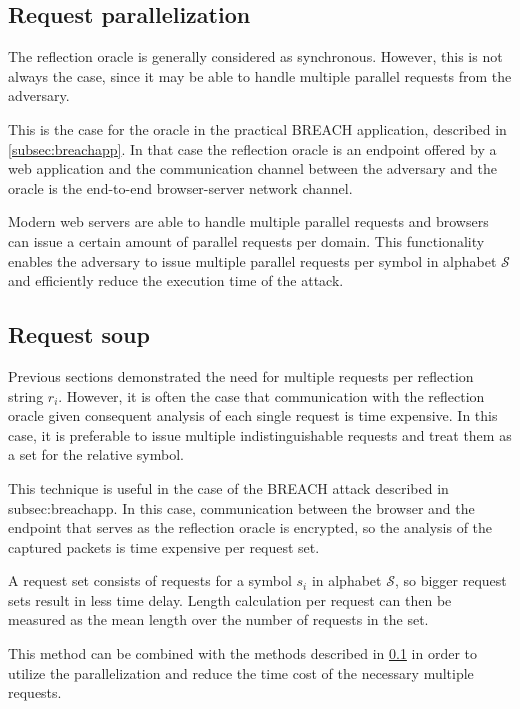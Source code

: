\documentclass{sig-alternate-05-2015}
\begin{document}
\subsection{Request parallelization}\label{subsec:parallel}
The reflection oracle is generally considered as synchronous. However, this is not
always the case, since it may be able to handle multiple parallel requests from
the adversary.

This is the case for the oracle in the practical BREACH application, described
in \ref{subsec:breachapp}. In that case the reflection oracle is an endpoint
offered by a web application and the communication channel between the adversary
and the oracle is the end-to-end browser-server network channel.

Modern web servers are able to handle multiple parallel requests and
browsers can issue a certain amount of parallel requests per domain. This
functionality enables the adversary to issue multiple parallel requests per
symbol in alphabet $\mathcal{S}$ and efficiently reduce the execution time of
the attack.

\subsection{Request soup}
Previous sections demonstrated the need for multiple requests per reflection
string $r_i$. However, it is often the case that communication with the
reflection oracle given consequent analysis of each single request is time
expensive. In this case, it is preferable to issue multiple indistinguishable
requests and treat them as a set for the relative symbol.

This technique is useful in the case of the BREACH attack described in
{subsec:breachapp}. In this case, communication between the browser and the
endpoint that serves as the reflection oracle is encrypted, so the analysis of
the captured packets is time expensive per request set.

A request set consists of requests for a symbol $s_i$ in alphabet $\mathcal{S}$,
so bigger request sets result in less time delay. Length calculation per request
can then be measured as the mean length over the number of requests in the set.

This method can be combined with the methods described in \ref{subsec:parallel}
in order to utilize the parallelization and reduce the time cost of the
necessary multiple requests.
\end{document}

